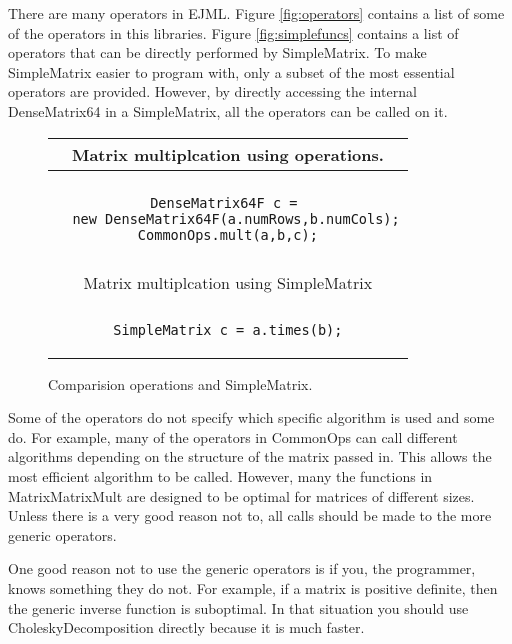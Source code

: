 \documentclass[12pt]{article}%
\begin{document}
There are many operators in EJML.  Figure \ref{fig:operators} contains a list of some of the operators in this libraries.  Figure \ref{fig:simplefuncs} contains a list of operators that can be directly performed by SimpleMatrix.  To make SimpleMatrix easier to program with, only a subset of the most essential operators are provided.  However, by directly accessing the internal DenseMatrix64 in a SimpleMatrix, all the operators can be called on it.

\begin{figure}[h]
\begin{center}
\begin{tabular}{c}
Matrix multiplcation using operations. \\
\hline \\
\begin{minipage}[c]{10cm}
\begin{verbatim}
DenseMatrix64F c = 
  new DenseMatrix64F(a.numRows,b.numCols);
CommonOps.mult(a,b,c);
\end{verbatim}
\end{minipage}
\\
\vspace{1cm}\\
Matrix multiplcation using SimpleMatrix \\
\hline \\
\begin{minipage}[c]{10cm}
\begin{verbatim}
SimpleMatrix c = a.times(b);
\end{verbatim}
\end{minipage}
\end{tabular}
\end{center}
\caption{\label{fig:ops_vs_simple}Comparision operations and SimpleMatrix.}
\end{figure}

Some of the operators do not specify which specific algorithm is used and some do.  For example, many of the operators in CommonOps can call different algorithms depending on the structure of the matrix passed in.  This allows the most efficient algorithm to be called.  However, many the functions in MatrixMatrixMult are designed to be optimal for matrices of different sizes.  Unless there is a very good reason not to, all calls should be made to the more generic operators. 

One good reason not to use the generic operators is if you, the programmer, knows something they do not.  For example, if a matrix is positive definite, then the generic inverse function is suboptimal.  In that situation you should use CholeskyDecomposition directly because it is much faster.
\end{document}
